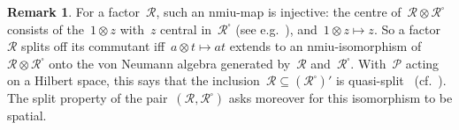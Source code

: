\documentclass{article}
\theoremstyle{plain}
\theoremstyle{definition}
\newtheorem{remark}[theorem]{Remark}
\begin{document}
\begin{remark}\label{rem:quasi-split}
For a factor~$\mathscr{R}$,
    such an nmiu-map is injective:
    the centre of~$\mathscr{R} \otimes \mathscr{R}^\square$
    consists of the~$1 \otimes z$ with~$z$ central in~$\mathscr{R}^\square$
    (see e.g.~\cite[Ch.~IV]{takesaki}),
    and~$1 \otimes z \mapsto z$.
So a factor~$\mathscr{R}$ splits off its commutant
    iff~$a \otimes t \mapsto at$
    extends to an nmiu-isomorphism of~$\mathscr{R} \otimes \mathscr{R}^\square$
    onto the von Neumann algebra generated
    by~$\mathscr{R}$ and~$\mathscr{R}^\square$.
With~$\mathscr{P}$ acting on a Hilbert space,
    this says that the inclusion~$\mathscr{R} \subseteq (\mathscr{R}^\square)'$
    is quasi-split~\cite[Def.~1.4 and~(1.2)]{dl} (cf.~\cite{dal}).
The split property of the pair~$(\mathscr{R}, \mathscr{R}^\square)$
    \cite[\S4]{summers}
    asks moreover for this isomorphism to be spatial.
\end{remark}
\end{document}
